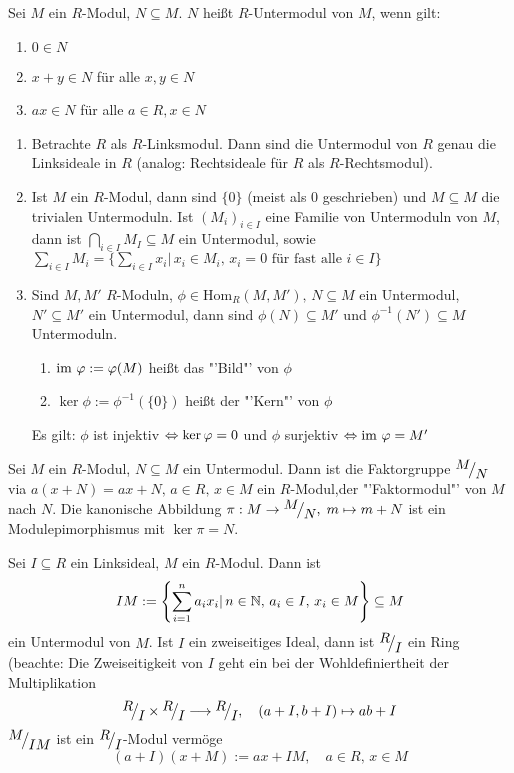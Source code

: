 \begin{df}
	Sei $M$ ein $R$-Modul, $N\subseteq M$. $N$ heißt $R$-Untermodul von $M$, wenn gilt:
	\begin{enumerate}[label= \alph*)]
		\item $0\in N$
		\item $x+y\in N$ für alle $x,y\in N$
		\item $ax\in N$ für alle $a\in R, x\in N$
	\end{enumerate}
\end{df}
\begin{bsp}
	\begin{enumerate}[label=\alph*)]
		\item Betrachte $R$ als $R$-Linksmodul. Dann sind die Untermodul von $R$ genau die Linksideale in $R$ (analog: Rechtsideale für $R$ als $R$-Rechtsmodul).
		\item Ist $M$ ein $R$-Modul, dann sind $\{0\}$ (meist als $0$ geschrieben) und $M\subseteq M$ die trivialen Untermoduln. Ist $(M_i)_{i\in I}$ eine Familie von Untermoduln von $M$, dann ist $\bigcap_{i\in I} M_I\subseteq M$ ein Untermodul, sowie $\sum_{i\in I} M_i = \{\sum_{i\in I} x_i|\, x_i \in M_i, \, x_i=0 \text{ für fast alle } i\in I\}$
		\item Sind $M, M'$ $R$-Moduln, $\phi\in \text{Hom}_R(M, M'), \, N\subseteq M$ ein Untermodul, $N' \subseteq M'$ ein Untermodul, dann sind $\phi(N) \subseteq M'$ und $\phi^{-1}(N') \subseteq M$ Untermoduln. 
		\begin{enumerate}
			\item[] $\operatorname{\text{im}\,} \varphi:= \varphi(M)$ heißt das "'Bild"' von $\phi$
			\item[] $\ker \phi:= \phi^{-1}(\{0\})$ heißt der "'Kern"' von $\phi$
		\end{enumerate}
	Es gilt: $\phi$ ist injektiv $\Leftrightarrow \ker \varphi =0$ und $\phi$ surjektiv $\Leftrightarrow \operatorname{\text{im}\,} \varphi = M'$
	\end{enumerate}
\end{bsp}
\begin{bem+df}
	Sei $M$ ein $R$-Modul, $N\subseteq M$ ein Untermodul. Dann ist die Faktorgruppe $\QR{M}{N}$ via $a(x+N) = ax+N, \, a\in R, \,x\in M$ ein $R$-Modul,der "'Faktormodul"' von $M$ nach $N$. Die kanonische Abbildung $\pi:M \to \QR{M}{N}, \; m \mapsto m+N$ ist ein Modulepimorphismus mit $\ker \pi = N$.
\end{bem+df}
\begin{bsp}
	Sei $I\subseteq R$ ein Linksideal, $M$ ein $R$-Modul. Dann ist 
	$$IM:= \left\{\sum_{i=1}^n a_i x_i|\, n\in \mathbb{N}, \, a_i \in I, \, x_i \in M\right\}\subseteq M$$
	ein Untermodul von $M$. Ist $I$ ein zweiseitiges Ideal, dann ist $\QR{R}{I}$ ein Ring (beachte: Die Zweiseitigkeit von $I$ geht ein bei der Wohldefiniertheit der Multiplikation
	$$\QR{R}{I} \times \QR{R}{I} \longrightarrow \QR{R}{I}, \quad (a+I, b+I) \mapsto ab+I$$
	$\QR{M}{IM}$ ist ein $\QR{R}{I}$-Modul vermöge
	$$(a+I)(x+M) := ax+IM, \quad a\in R, \, x\in M$$ 
\end{bsp}

